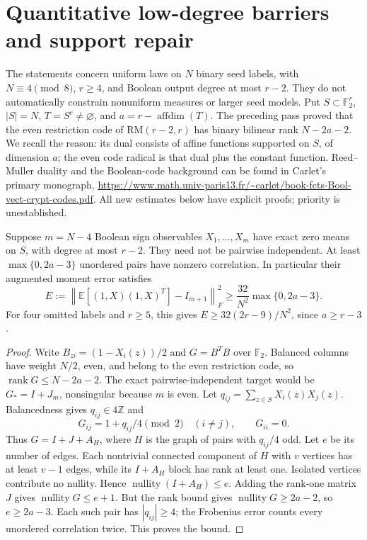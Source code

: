 \section{Quantitative low-degree barriers and support repair}
\label{sec:nonlinear-quantitative}
The statements concern uniform laws on $N$ binary seed labels, with
$N\equiv4\pmod8$, $r\ge4$, and Boolean output degree at most $r-2$.
They do not automatically constrain nonuniform measures or larger seed
models. Put $S\subset\mathbb F_2^r$, $|S|=N$, $T=S^c\ne\varnothing$,
and $a=r-\operatorname{affdim}(T)$. The preceding pass proved that the
even restriction code of $\mathrm{RM}(r-2,r)$ has binary bilinear rank
$N-2a-2$. We recall the reason: its dual consists of affine functions
supported on $S$, of dimension $a$; the even code radical is that dual
plus the constant function. Reed--Muller duality and the Boolean-code
background can be found in Carlet's primary monograph,
\url{https://www.math.univ-paris13.fr/~carlet/book-fcts-Bool-vect-crypt-codes.pdf}.
All new estimates below have explicit proofs; priority is unestablished.

\begin{theorem}
\label{thm:nonlinear-moment-floor}
Suppose $m=N-4$ Boolean sign observables $X_1,\ldots,X_m$ have exact
zero means on $S$, with degree at most $r-2$. They need not be pairwise
independent. At least $\max\{0,2a-3\}$ unordered pairs have nonzero
correlation. In particular their augmented moment error satisfies
\[
 E:=\left\|\mathbb E[(1,X)(1,X)^T]-I_{m+1}\right\|_F^2
 \ge\frac{32}{N^2}\max\{0,2a-3\}.
\]
For four omitted labels and $r\ge5$, this gives
$E\ge32(2r-9)/N^2$, since $a\ge r-3$.
\end{theorem}
\begin{proof}
Write $B_{zi}=(1-X_i(z))/2$ and $G=B^TB$ over $\mathbb F_2$.
Balanced columns have weight $N/2$, even, and belong to the even
restriction code, so $\operatorname{rank}G\le N-2a-2$.
The exact pairwise-independent target would be $G_*=I+J_m$,
nonsingular because $m$ is even. Let $q_{ij}=\sum_{z\in S}X_i(z)X_j(z)$.
Balancedness gives $q_{ij}\in4\mathbb Z$ and
\[
 G_{ij}=1+q_{ij}/4\pmod2\quad(i\ne j),\qquad G_{ii}=0.
\]
Thus $G=I+J+A_H$, where $H$ is the graph of pairs with $q_{ij}/4$ odd.
Let $e$ be its number of edges. Each nontrivial connected component of
$H$ with $v$ vertices has at least $v-1$ edges, while its $I+A_H$ block
has rank at least one. Isolated vertices contribute no nullity. Hence
$\operatorname{nullity}(I+A_H)\le e$. Adding the rank-one matrix $J$
gives $\operatorname{nullity}G\le e+1$.
But the rank bound gives $\operatorname{nullity}G\ge2a-2$, so
$e\ge2a-3$. Each such pair has $|q_{ij}|\ge4$; the Frobenius error
counts every unordered correlation twice. This proves the bound.
\end{proof}

